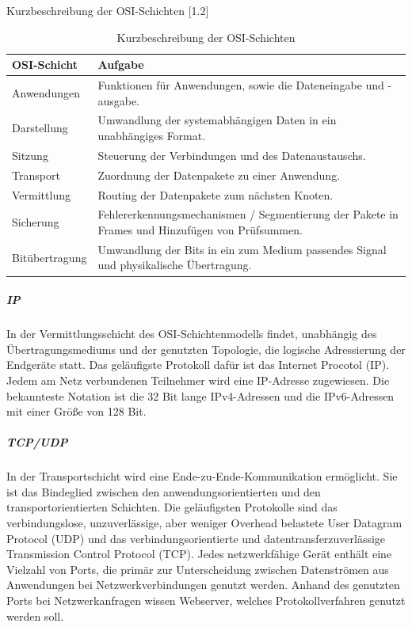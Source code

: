 \newpage

\begin{table}[tbt]
\caption{Kurzbeschreibung der OSI-Schichten [1.2]}
\begin{center}
    \begin{tabular}{ l  p{8cm} }
    \toprule
     OSI-Schicht & Aufgabe \\ 
     \midrule
        
    Anwendungen & Funktionen für Anwendungen, sowie die Dateneingabe und -ausgabe. \\

    Darstellung & Umwandlung der systemabhängigen Daten in ein unabhängiges Format.  \\

    Sitzung & Steuerung der Verbindungen und des Datenaustauschs.  \\

    Transport & Zuordnung der Datenpakete zu einer Anwendung. \\
    
	Vermittlung & Routing der Datenpakete zum nächsten Knoten. \\
	
	Sicherung & Fehlererkennungsmechanismen / Segmentierung der Pakete in Frames und Hinzufügen von Prüfsummen.  \\
    
    Bitübertragung & Umwandlung der Bits in ein zum Medium passendes Signal und physikalische Übertragung.\\ 
    \bottomrule
    \end{tabular}
\end{center}
\caption{Kurzbeschreibung der OSI-Schichten \cite{ekOSI}}
\end{table}

\noindent
\subparagraph{IP}
In der Vermittlungsschicht des OSI-Schichtenmodells findet, unabhängig des Über\-tra\-gungs\-mediums und der genutzten Topologie, die logische Adressierung der Endgeräte statt. Das geläufigste Protokoll dafür ist das Internet Procotol (IP). Jedem am Netz verbundenen Teilnehmer wird eine IP-Adresse zugewiesen. Die bekannteste Notation ist die 32 Bit lange IPv4-Adressen und die IPv6-Adressen mit einer Größe von 128 Bit.

\noindent
\subparagraph{TCP/UDP}
In der Transportschicht wird eine Ende-zu-Ende-Kommunikation ermöglicht. Sie ist das Bindeglied zwischen den anwendungsorientierten und den transportorientierten Schichten. Die geläufigsten Protokolle sind das verbindungslose, unzuverlässige, aber weniger Overhead belastete User Datagram Protocol (UDP) und das verbindungsorientierte und datentransferzuverlässige Transmission Control Protocol (TCP). Jedes netzwerkfähige Gerät enthält eine Vielzahl von Ports, die primär zur
Unterscheidung zwischen Datenströmen aus Anwendungen bei Netzwerkverbindungen
genutzt werden. Anhand des genutzten Ports bei Netzwerkanfragen
wissen Webserver, welches Protokollverfahren genutzt werden soll.

